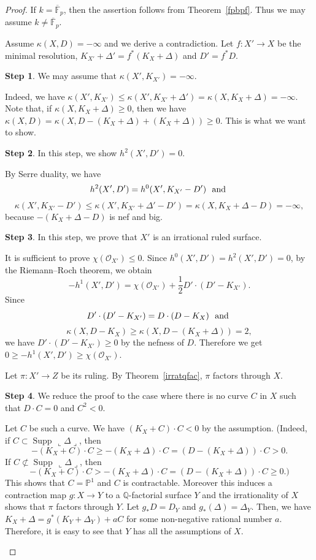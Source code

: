 \documentclass[12pt,twoside]{amsart}
\newcommand{\Supp}[0]{{\operatorname{Supp}}}
\theoremstyle{definition}
\newtheorem{step}{Step}
\newcommand{\Q}{$\mathbb{Q}$}
\begin{document}
\begin{proof}
If $k=\overline{\mathbb{F}}_p$, 
then the assertion follows from Theorem~\ref{fpbpf}. 
Thus we may assume $k\neq\overline{\mathbb{F}}_p.$

Assume $\kappa(X, D)=-\infty$ and we derive a contradiction.
Let $f: X' \to X$ be the minimal resolution, 
$K_{X'}+\Delta'=f^*(K_X+\Delta)$ and $D'=f^*D$.


\setcounter{step}{0}
\begin{step}
We may assume that $\kappa(X', K_{X'})=-\infty$.

Indeed, we have $\kappa(X', K_{X'}) \leq \kappa(X', K_{X'}+\Delta')
=\kappa(X, K_X+\Delta)=-\infty. $
Note that, if $\kappa(X, K_X+\Delta) \geq 0$, then 
we have 
$\kappa(X, D)=\kappa(X, D-(K_X+\Delta)+(K_X+\Delta)) \geq 0$.
This is what we want to show. 
\end{step}

\begin{step}
In this step, we show $h^2(X', D')=0$.

By Serre duality, we have 
$$h^2(X', D')=h^0(X', K_{X'}-D')\,\,\,\,{\rm and}\,\,$$
$$\kappa(X', K_{X'}-D') \leq 
\kappa(X', K_{X'}+\Delta'-D') = 
\kappa(X, K_X+\Delta-D)=-\infty,$$
because $-(K_X+\Delta-D)$ is nef and big. 
\end{step}

\begin{step}
In this step, we prove that $X'$ is an irrational ruled surface. 

It is sufficient to prove $\chi(\mathcal{O}_{X'}) \leq 0$.
Since $h^0(X', D')=h^2(X', D')=0$, by the Riemann--Roch theorem, 
we obtain 
$$-h^1(X', D')=\chi(\mathcal{O}_{X'})+\frac{1}{2}D'\cdot (D'-K_{X'}). $$ 
Since 
$$D'\cdot (D'-K_{X'})=D\cdot (D-K_X)\,\,\,\,{\rm and}\,\,$$
$$\kappa(X, D-K_X) \geq \kappa(X, D-(K_X+\Delta)) =2, $$
we have $D'\cdot (D'-K_{X'}) \geq 0 $ by the nefness of $D$. 
Therefore we get $0 \geq -h^1(X', D') \geq \chi(\mathcal{O}_{X'})$. 
\end{step}

Let $\pi:X' \to Z$ be its ruling. 
By Theorem~\ref{irratqfac}, $\pi$ factors through $X$.


\begin{step}
We reduce the proof to the case where there is no curve $C$ in $X$ such that 
$D\cdot C=0$ and $C^2<0$. 

Let $C$ be such a curve. 
We have $(K_X+C)\cdot C<0$ by the assumption. 
(Indeed, if $C \subset \Supp\,\llcorner\Delta\lrcorner$, then 
$$-(K_X+C)\cdot C\geq -(K_X+\Delta)\cdot C=(D-(K_X+\Delta))\cdot C>0.$$
If $C \not\subset \Supp\,\llcorner\Delta\lrcorner$, then 
$$-(K_X+C)\cdot C> -(K_X+\Delta)\cdot C=(D-(K_X+\Delta))\cdot C\geq 0.)$$ 
This shows that $C=\mathbb{P}^1$ and $C$ is contractable. 
Moreover this induces a contraction map $g:X \to Y$ 
to a \Q-factorial surface $Y$ and 
the irrationality of $X$ shows that $\pi$ factors through $Y$. 
Let $g_*D=D_Y$ and $g_*(\Delta)=\Delta_Y$. 
Then, we have $K_X+\Delta=g^*(K_Y+\Delta_Y)+aC$ 
for some non-negative rational number $a$. 
Therefore, it is easy to see that 
$Y$ has all the assumptions of $X$. 
\end{step}


\end{proof}
\end{document}
